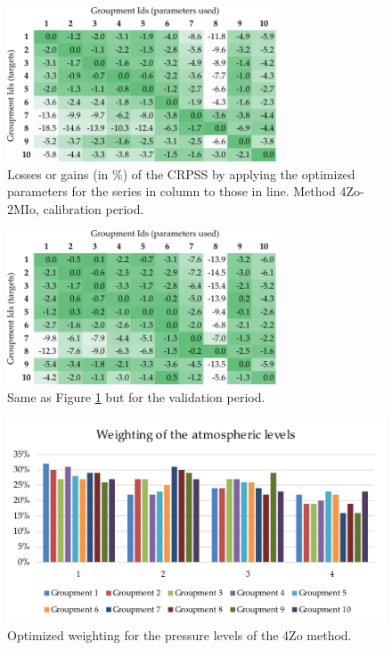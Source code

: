 \documentclass[5p]{elsarticle}
\begin{document}
\begin{figure}[htb]
	\centerline{\includegraphics[width=8cm]{figures/table_crossing_z4-hi2_calib.pdf}}
	\caption{Losses or gains (in \%) of the CRPSS by applying the optimized parameters for the series in column to those in line. Method 4Zo-2MIo, calibration period.}
	\label{fig:crossing_4Zo-2MIo_calib}
\end{figure}

\begin{figure}[htb]
	\centerline{\includegraphics[width=8cm]{figures/table_crossing_z4-hi2_valid.pdf}}
	\caption{Same as Figure \ref{fig:crossing_4Zo-2MIo_calib} but for the validation period.}
	\label{fig:crossing_4Zo-2MIo_valid}
\end{figure}

\begin{figure}[htb]
	\centerline{\includegraphics[width=\linewidth]{figures/figure_levels_weights.pdf}}
	\caption{Optimized weighting for the pressure levels of the 4Zo method.}
	\label{fig:levels_weights}
\end{figure}
\end{document}
